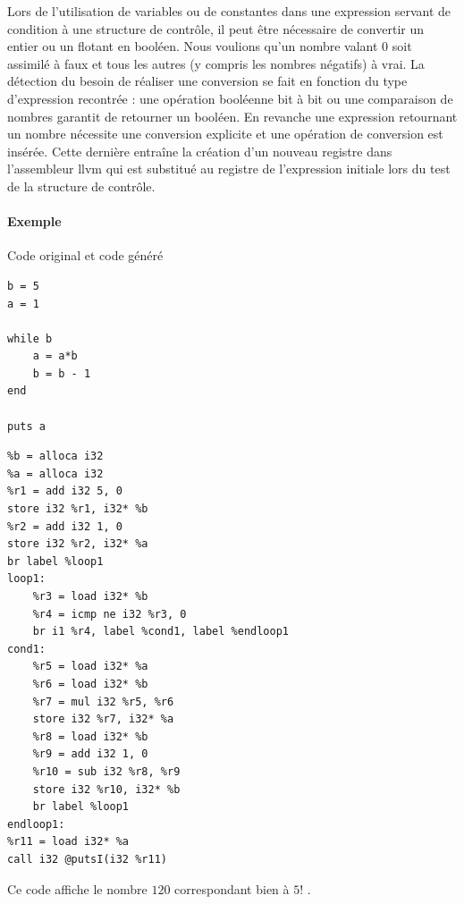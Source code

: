 \documentclass[12pt]{article}
\begin{document}
Lors de l'utilisation de variables ou de constantes dans une expression servant de condition à une structure de contrôle, il peut être nécessaire de convertir un entier ou un flotant en booléen. Nous voulions qu'un nombre valant 0 soit assimilé à faux et tous les autres (y compris les nombres négatifs) à vrai. La détection du besoin de réaliser une conversion se fait en fonction du type d'expression recontrée : une opération booléenne bit à bit ou une comparaison de nombres garantit de retourner un booléen. En revanche une expression retournant un nombre nécessite une conversion explicite et une opération de conversion est insérée. Cette dernière entraîne la création d'un nouveau registre dans l'assembleur llvm qui est substitué au registre de l'expression initiale lors du test de la structure de contrôle.

\paragraph{Exemple} Code original et code généré

\vspace{0.5cm}

\begin{minipage}{0.48\textwidth}
\begin{verbatim}
b = 5
a = 1

while b
    a = a*b
    b = b - 1
end

puts a
\end{verbatim}
\end{minipage}
\begin{minipage}{0.48\textwidth}
\begin{verbatim}
%b = alloca i32
%a = alloca i32
%r1 = add i32 5, 0
store i32 %r1, i32* %b
%r2 = add i32 1, 0
store i32 %r2, i32* %a
br label %loop1
loop1:
    %r3 = load i32* %b
    %r4 = icmp ne i32 %r3, 0
    br i1 %r4, label %cond1, label %endloop1
cond1:
    %r5 = load i32* %a
    %r6 = load i32* %b
    %r7 = mul i32 %r5, %r6
    store i32 %r7, i32* %a
    %r8 = load i32* %b
    %r9 = add i32 1, 0
    %r10 = sub i32 %r8, %r9
    store i32 %r10, i32* %b
    br label %loop1
endloop1:
%r11 = load i32* %a
call i32 @putsI(i32 %r11)

\end{verbatim}
\end{minipage}

\vspace{0.5cm}

Ce code affiche le nombre $120$ correspondant bien à $5!$ .
\end{document}
